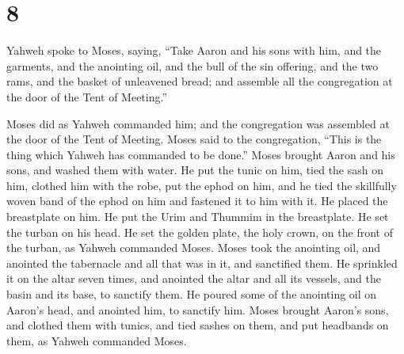 \hypertarget{section-7}{%
\section{8}\label{section-7}}

 Yahweh spoke to Moses, saying,  ``Take Aaron
and his sons with him, and the garments, and the anointing oil, and the
bull of the sin offering, and the two rams, and the basket of unleavened
bread;  and assemble all the congregation at the door of the
Tent of Meeting.''

 Moses did as Yahweh commanded him; and the congregation was
assembled at the door of the Tent of Meeting.  Moses said to
the congregation, ``This is the thing which Yahweh has commanded to be
done.''  Moses brought Aaron and his sons, and washed them
with water.  He put the tunic on him, tied the sash on him,
clothed him with the robe, put the ephod on him, and he tied the
skillfully woven band of the ephod on him and fastened it to him with
it.  He placed the breastplate on him. He put the Urim and
Thummim in the breastplate.  He set the turban on his head.
He set the golden plate, the holy crown, on the front of the turban, as
Yahweh commanded Moses.  Moses took the anointing oil, and
anointed the tabernacle and all that was in it, and sanctified them.
 He sprinkled it on the altar seven times, and anointed the
altar and all its vessels, and the basin and its base, to sanctify them.
 He poured some of the anointing oil on Aaron's head, and
anointed him, to sanctify him.  Moses brought Aaron's sons,
and clothed them with tunics, and tied sashes on them, and put headbands
on them, as Yahweh commanded Moses.

